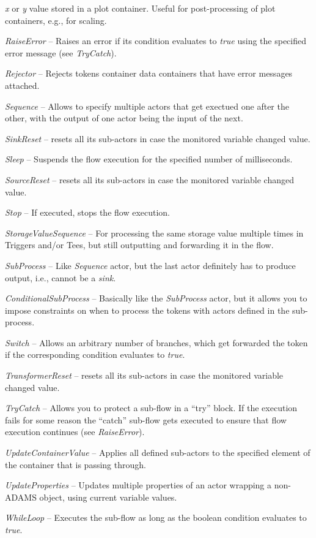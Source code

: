 \begin{tight_itemize}
	\textit{x} or \textit{y} value stored in a plot container. Useful for
	post-processing of plot containers, e.g., for scaling.
	\item \textit{RaiseError} -- Raises an error if its condition evaluates to
	\textit{true} using the specified error message (see \textit{TryCatch}).
	\item \textit{Rejector} -- Rejects tokens container data containers that have
	error messages attached.
	\item \textit{Sequence} -- Allows to specify multiple actors that get exectued
	one after the other, with the output of one actor being the input of the next.
	\item \textit{SinkReset} -- resets all its sub-actors in case the monitored
	variable changed value.
	\item \textit{Sleep} -- Suspends the flow execution for the specified number of
	milliseconds.
	\item \textit{SourceReset} -- resets all its sub-actors in case the monitored
	variable changed value.
	\item \textit{Stop} -- If executed, stops the flow execution.
	\item \textit{StorageValueSequence} -- For processing the same storage value
	multiple times in Triggers and/or Tees, but still outputting and forwarding
	it in the flow.
	\item \textit{SubProcess} -- Like \textit{Sequence} actor, but the last actor
	definitely has to produce output, i.e., cannot be a \textit{sink}.
	\item \textit{ConditionalSubProcess} -- Basically like the \textit{SubProcess}
	actor, but it allows you to impose constraints on when to process the tokens
	with actors defined in the sub-process.
	\item \textit{Switch} -- Allows an arbitrary number of branches, which get
	forwarded the token if the corresponding condition evaluates to \textit{true}.
	\item \textit{TransformerReset} -- resets all its sub-actors in case the monitored
	variable changed value.
	\item \textit{TryCatch} -- Allows you to protect a sub-flow in a ``try''
	block. If the execution fails for some reason the ``catch'' sub-flow gets
	executed to ensure that flow execution continues (see \textit{RaiseError}).
	\item \textit{UpdateContainerValue} -- Applies all defined sub-actors to the
	specified element of the container that is passing through.
	\item \textit{UpdateProperties} -- Updates multiple properties of an actor
	wrapping a non-ADAMS object, using current variable values.
	\item \textit{WhileLoop} -- Executes the sub-flow as long as the boolean
	condition evaluates to \textit{true}.
\end{tight_itemize}

